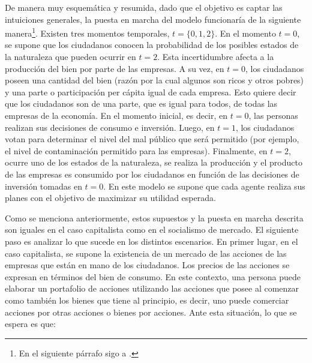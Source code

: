 De manera muy esquemática y resumida, dado que el objetivo es captar las intuiciones generales, la puesta en marcha del modelo funcionaría de la siguiente manera\footnote{En el siguiente párrafo sigo a \citet[p. 62]{Roemer_1994}.}. Existen tres momentos temporales, $t=\{0,1,2\}$. En el momento $t=0$, se supone que los ciudadanos conocen la probabilidad de los posibles estados de la naturaleza que pueden ocurrir en $t=2$. Esta incertidumbre afecta a la producción del bien por parte de las empresas. A su vez, en $t=0$, los ciudadanos poseen una cantidad del bien (razón por la cual algunos son ricos y otros pobres) y una parte o participación per cápita igual de cada empresa. Esto quiere decir que los ciudadanos son  de una parte, que es igual para todos, de todas las empresas de la economía. En el momento inicial, es decir, en $t=0$, las personas realizan sus decisiones de consumo e inversión. Luego, en $t=1$, los ciudadanos votan para determinar el nivel del mal público que será permitido (por ejemplo, el nivel de contaminación permitido para las empresas). Finalmente, en $t=2$, ocurre uno de los estados de la naturaleza, se realiza la producción y el producto de las empresas es consumido por los ciudadanos en función de las decisiones de inversión tomadas en $t=0$. En este modelo se supone que cada agente realiza sus planes con el objetivo de maximizar su utilidad esperada.

Como se menciona anteriormente, estos supuestos y la puesta en marcha descrita son iguales en el caso capitalista como en el socialismo de mercado. El siguiente paso es analizar lo que sucede en los distintos escenarios. En primer lugar, en el caso capitalista, se supone la existencia de un mercado de las acciones de las empresas que están en mano de los ciudadanos. Los precios de las acciones se expresan en términos del bien de consumo. En este contexto, una persona puede elaborar un portafolio de acciones utilizando las acciones que posee al comenzar como también los bienes que tiene al principio, es decir, uno puede comerciar acciones por otras acciones o bienes por acciones. Ante esta situación, lo que se espera es que: 

